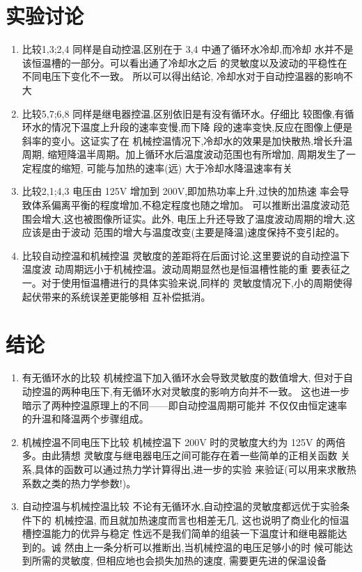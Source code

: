 \documentclass[11pt]{report}
\begin{document}
\section{实验讨论}
\label{sec:org0eedf25}
\begin{enumerate}
\item 比较1,3;2,4
\label{sec:org121e766}
同样是自动控温,区别在于 3,4 中通了循环水冷却,而冷却
水并不是该恒温槽的一部分。可以看出通了冷却水之后
的灵敏度以及波动的平稳性在不同电压下变化不一致。
所以可以得出结论, 冷却水对于自动控温器的影响不大
\item 比较5,7;6,8
\label{sec:orgc9bdf0a}
同样是继电器控温,区别依旧是有没有循环水。仔细比
较图像,有循环水的情况下温度上升段的速率变慢,而下降
段的速率变快,反应在图像上便是斜率的变小。这证实了在
机械控温情况下,冷却水的效果是加快散热,增长升温周期,
缩短降温半周期。加上循环水后温度波动范围也有所增加,
周期发生了一定程度的缩短, 可能与加热的速率(远)
大于冷却水降温速率有关
\item 比较2,1;4,3
\label{sec:orgbfa0f8c}
电压由 125V 增加到 200V,即加热功率上升,过快的加热速
率会导致体系偏离平衡的程度增加,不稳定程度也随之增加。
可以推断出温度波动范围会增大,这也被图像所证实。此外,
电压上升还导致了温度波动周期的增大,这应该是由于波动
范围的增大与温度改变(主要是降温)速度保持不变引起的。
\item 比较自动控温和机械控温
\label{sec:orgfd27cc5}
灵敏度的差距将在后面讨论,这里要说的自动控温下温度波
动周期远小于机械控温。波动周期显然也是恒温槽性能的重
要表征之一。对于使用恒温槽进行的具体实验来说,同样的
灵敏度情况下,小的周期使得起伏带来的系统误差更能够相
互补偿抵消。
\end{enumerate}

\section{结论}
\label{sec:org5b033c1}
\begin{enumerate}
\item 有无循环水的比较
\label{sec:org165b3e1}
机械控温下加入循环水会导致灵敏度的数值增大,
但对于自动控温的两种电压下,有无循环水对灵敏度的影响方向并不一致。
这也进一步暗示了两种控温原理上的不同——即自动控温周期可能并
不仅仅由恒定速率的升温和降温两个步骤组成。
\item 机械控温不同电压下比较
\label{sec:orgbd77b39}
机械控温下 200V 时的灵敏度大约为 125V 的两倍多。由此猜想
灵敏度与继电器电压之间可能存在着一些简单的正相关函数
关系,具体的函数可以通过热力学计算得出,进一步的实验
来验证(可以用来求散热系数之类的热力学参数!)。
\item 自动控温与机械控温比较
\label{sec:org9159f2c}
不论有无循环水,自动控温的灵敏度都远优于实验条件下的
机械控温, 而且就加热速度而言也相差无几, 这也说明了商业化的恒温槽控温能力的优异与稳定
性远不是我们简单的组装一下温度计和继电器能达到的。诚
然由上一条分析可以推断出,当机械控温的电压足够小的时
候可能达到所需的灵敏度, 但相应地也会损失加热的速度, 需要更先进的保温设备
\end{enumerate}
\end{document}
